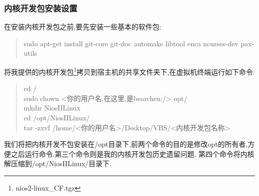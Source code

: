 \documentclass[12pt,a4paper,titlepage]{article}
\begin{document}
\subsubsection{内核开发包安装设置}
在安装内核开发包之前,要先安装一些基本的软件包:
\begin{verse}
sudo apt-get install git-core git-doc automake libtool enca ncurses-dev pax-utils
\end{verse}

将我提供的内核开发包\footnote{nios2-linux\_CF.tgz}拷贝到{宿主机}的共享文件夹下,在{虚拟机终端}运行如下命令:
\begin{verse}
cd /\\sudo chown <你的用户名,在这里,是bearchen:/> opt/\\mkdir NiosIILinux\\cd /opt/NiosIILinux/\\
tar -zxvf /home/<你的用户名>/Desktop/VBS/<内核开发包名称>
\end{verse}
我们将把内核开发不包安装在/opt目录下,前两个命令的目的是修改opt的所有者,方便之后运行命令.第三个命令则是我的内核开发包历史遗留问题.
第四个命令将内核解压缩到/opt/NiosIILinux/目录下.
\end{document}
